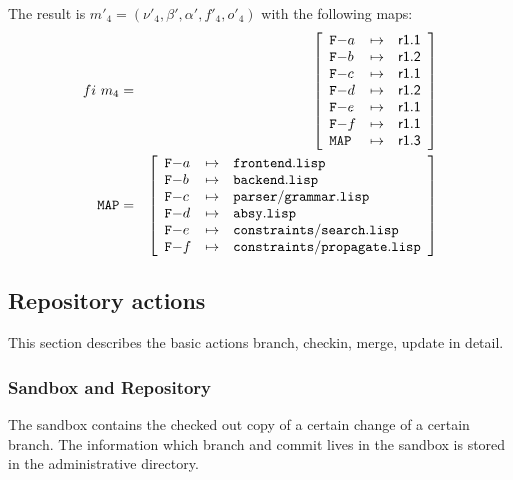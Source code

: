 \documentclass[fleqn, 10pt, a4paper]{report} \usepackage{amssymb}
\begin{document}
The result is $m'_4=(\nu'_4, \beta', \alpha', f'_4, o'_4)$ with the
following maps:
\begin{eqnarray*}
  \mathnormal{fi}\ m_4 &=& \left[
    \begin{array}{lcl}
      \mathtt{F-}a & \mapsto & \mathsf{r1.1} \\
      \mathtt{F-}b & \mapsto & \mathsf{r1.2} \\
      \mathtt{F-}c & \mapsto & \mathsf{r1.1} \\
      \mathtt{F-}d & \mapsto & \mathsf{r1.2} \\
      \mathtt{F-}e & \mapsto & \mathsf{r1.1} \\
      \mathtt{F-}f & \mapsto & \mathsf{r1.1} \\
      \mathtt{MAP} & \mapsto & \mathsf{r1.3} \\
    \end{array}\right] \\
  \mathtt{MAP} &=& \left[
    \begin{array}{lcl}
      \mathtt{F-}a &\mapsto& \mathtt{frontend.lisp} \\
      \mathtt{F-}b &\mapsto& \mathtt{backend.lisp} \\
      \mathtt{F-}c &\mapsto& \mathtt{parser/grammar.lisp} \\
      \mathtt{F-}d &\mapsto& \mathtt{absy.lisp} \\
      \mathtt{F-}e &\mapsto& \mathtt{constraints/search.lisp} \\
      \mathtt{F-}f &\mapsto& \mathtt{constraints/propagate.lisp} \\
    \end{array}\right]
\end{eqnarray*}


\subsection{Repository actions \label{ops}}

This section describes the basic actions branch, checkin, merge,
update in detail.

\subsubsection{Sandbox and Repository}

The sandbox contains the checked out copy of a certain change of a
certain branch. The information which branch and commit lives in the
sandbox is stored in the administrative directory.
\end{document}
